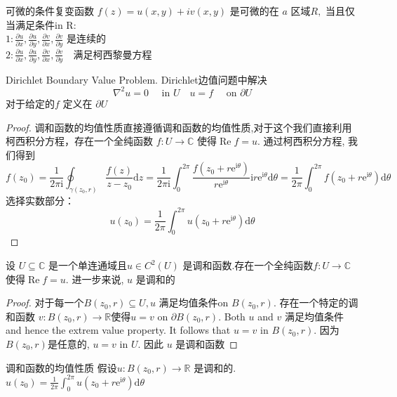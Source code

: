 \documentclass[cn,11pt,chinese,black]{elegantbook}
\begin{document}
\begin{theorem}{可微的条件}\noindent 复变函数 $f(z)=u(x, y)+i v(x, y)$ 是可微的在 $a$ 区域$R,$ 当且仅当满足条件in $\mathrm{R}:$ \\
$1: \frac{\partial u}{\partial x}, \frac{\partial u}{\partial y}, \frac{\partial v}{\partial x}, \frac{\partial v}{\partial y}$ 是连续的 \\
$2: \frac{\partial u}{\partial x}, \frac{\partial u}{\partial y}, \frac{\partial v}{\partial x}, \frac{\partial v}{\partial y} \quad$满足柯西黎曼方程
\end{theorem}
\begin{definition}{Dirichlet Boundary Value Problem.}
\noindent Dirichlet边值问题中解决
$$
\nabla^{2} u=0 \quad \text { in } U \quad u=f \quad \text { on } \partial U
$$
对于给定的$f$ 定义在 $\partial U$
\end{definition}
\begin{proof}
调和函数的均值性质直接遵循调和函数的均值性质,对于这个我们直接利用柯西积分方程，存在一个全纯函数 $f: U \rightarrow \mathbb{C}$ 使得$\operatorname{Re} f=u .$ 通过柯西积分方程, 我们得到
$$
f\left(z_{0}\right)=\frac{1}{2 \pi \mathrm{i}} \oint_{\gamma\left(z_{0}, r\right)} \frac{f(z)}{z-z_{0}} \mathrm{d} z=\frac{1}{2 \pi \mathrm{i}} \int_{0}^{2 \pi} \frac{f\left(z_{0}+r \mathrm{e}^{\mathrm{i} \theta}\right)}{r \mathrm{e}^{\mathrm{i} \theta}} \mathrm{i} r \mathrm{e}^{\mathrm{i} \theta} \mathrm{d} \theta=\frac{1}{2 \pi} \int_{0}^{2 \pi} f\left(z_{0}+r \mathrm{e}^{\mathrm{i} \theta}\right) \mathrm{d} \theta
$$
选择实数部分：
$$
u\left(z_{0}\right)=\frac{1}{2 \pi} \int_{0}^{2 \pi} u\left(z_{0}+r \mathrm{e}^{\mathrm{i} \theta}\right) \mathrm{d} \theta
$$
\end{proof}
\begin{proposition}
\noindent 设 $U \subseteq \mathbb{C}$ 是一个单连通域且$u \in C^{2}(U)$ 是调和函数.存在一个全纯函数$f: U \rightarrow \mathbb{C}$使得$\operatorname{Re} f=u .$ 进一步来说, $u$ 是调和的
\end{proposition}
\begin{proof} 对于每一个$B\left(z_{0}, r\right) \subseteq U, u$ 满足均值条件on $B\left(z_{0}, r\right) .$ 存在一个特定的调和函数 $v: B\left(z_{0}, r\right) \rightarrow \mathbb{R}$使得$u=v$ on $\partial B\left(z_{0}, r\right) .$ Both $u$ and $v$ 满足均值条件 and hence the extrem value property. It follows that $u=v$ in $B\left(z_{0}, r\right)$. 因为 $B\left(z_{0}, r\right)$是任意的, $u=v$ in $U$. 因此 $u$ 是调和函数
\end{proof}
\begin{theorem}{调和函数的均值性质}
\noindent 假设$u: B\left(z_{0}, r\right) \rightarrow \mathbb{R}$ 是调和的. 
$u\left(z_{0}\right)=\frac{1}{2 \pi} \int_{0}^{2 \pi} u\left(z_{0}+r \mathrm{e}^{\mathrm{i} \theta}\right) \mathrm{d} \theta$
\end{theorem}
\end{document}
